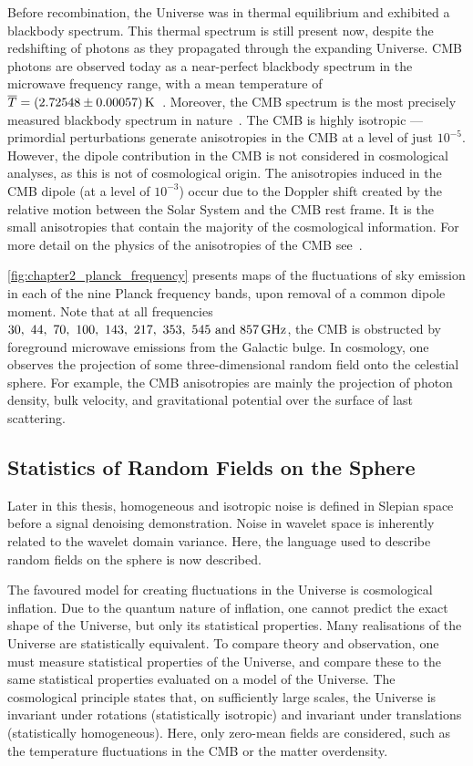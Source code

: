 Before recombination, the Universe was in thermal equilibrium and exhibited a blackbody spectrum.
This thermal spectrum is still present now, despite the redshifting of photons as they propagated through the expanding Universe.
CMB photons are observed today as a near-perfect blackbody spectrum in the microwave frequency range, with a mean temperature of \(\mean{T} = \SI{2.72548(0.00057)}{\kelvin}\)~\cite{Fixsen2009}.
Moreover, the CMB spectrum is the most precisely measured blackbody spectrum in nature~\cite{White1994}.
The CMB is highly isotropic --- primordial perturbations generate anisotropies in the CMB at a level of just \(10^{-5}\).
However, the dipole contribution in the CMB is not considered in cosmological analyses, as this is not of cosmological origin.
The anisotropies induced in the CMB dipole (at a level of \(10^{-3}\)) occur due to the Doppler shift created by the relative motion between the Solar System and the CMB rest frame.
It is the small anisotropies that contain the majority of the cosmological information.
For more detail on the physics of the anisotropies of the CMB see~\cite{Bucher2015}.

\cref{fig:chapter2_planck_frequency} presents maps of the fluctuations of sky emission in each of the nine Planck frequency bands, upon removal of a common dipole moment.
Note that at all frequencies \(\qtylist[list-units=single]{30;44;70;100;143;217;353;545;857}{\giga\hertz}\), the CMB is obstructed by foreground microwave emissions from the Galactic bulge.
In cosmology, one observes the projection of some three-dimensional random field onto the celestial sphere.
For example, the CMB anisotropies are mainly the projection of photon density, bulk velocity, and gravitational potential over the surface of last scattering.



\subsection{Statistics of Random Fields on the Sphere}\label{sec:chapter2_statistics_random_fields_sphere}

Later in this thesis, homogeneous and isotropic noise is defined in Slepian space before a signal denoising demonstration.
Noise in wavelet space is inherently related to the wavelet domain variance.
Here, the language used to describe random fields on the sphere is now described.

The favoured model for creating fluctuations in the Universe is cosmological inflation.
Due to the quantum nature of inflation, one cannot predict the exact shape of the Universe, but only its statistical properties.
Many realisations of the Universe are statistically equivalent.
To compare theory and observation, one must measure statistical properties of the Universe, and compare these to the same statistical properties evaluated on a model of the Universe.
The cosmological principle states that, on sufficiently large scales, the Universe is invariant under rotations (statistically isotropic) and invariant under translations (statistically homogeneous).
Here, only zero-mean fields are considered, such as the temperature fluctuations in the CMB or the matter overdensity.

